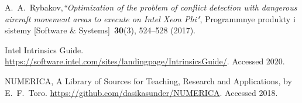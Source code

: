 \documentclass[
11pt,%
tightenlines,%
twoside,%
onecolumn,%
nofloats,%
nobibnotes,%
nofootinbib,%
superscriptaddress,%
noshowpacs,%
centertags]%
{revtex4}
\begin{document}
\begin{thebibliography}{99}

A.~A.~Rybakov,{\it ``Optimization of the problem of conflict detection with dangerous aircraft movement areas to execute on Intel Xeon Phi"}, Programmnye produkty i sistemy [Software \& Systems]~{\bf 30}(3), 524--528 (2017).

Intel Intrinsics Guide. \url{https://software.intel.com/sites/landingpage/IntrinsicsGuide/}. Accessed 2020.

NUMERICA, A Library of Sources for Teaching, Research and Applications, by E.~F.~Toro. \url{https://github.com/dasikasunder/NUMERICA}. Accessed 2018.

\end{thebibliography}
\end{document}
